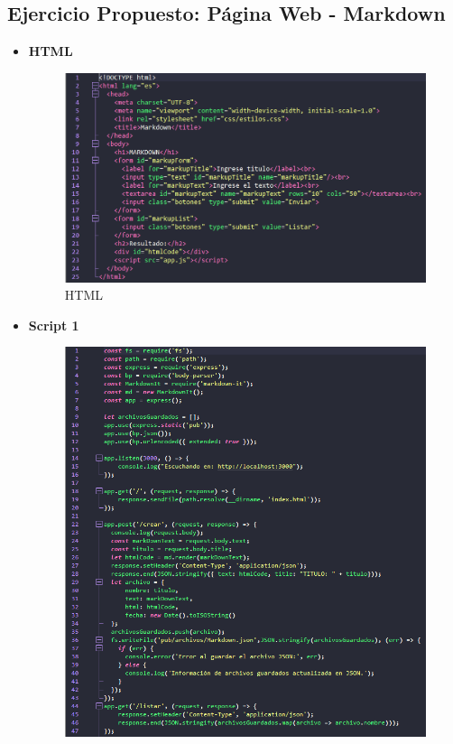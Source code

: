 \documentclass{article}
\begin{document}
	\subsection{Ejercicio Propuesto: Página Web - Markdown}
	\begin{itemize}
		\item \textbf{HTML}
		\begin{figure}[H]
			\centering
			\includegraphics[width=1\textwidth,keepaspectratio]{img/html.png}
			\caption{HTML }
		\end{figure}
		\item \textbf{Script 1}
		\begin{figure}[H]
			\centering
			\includegraphics[width=1\textwidth,keepaspectratio]{img/Scriptindex.png}

\end{figure}
\end{itemize}
\end{document}

